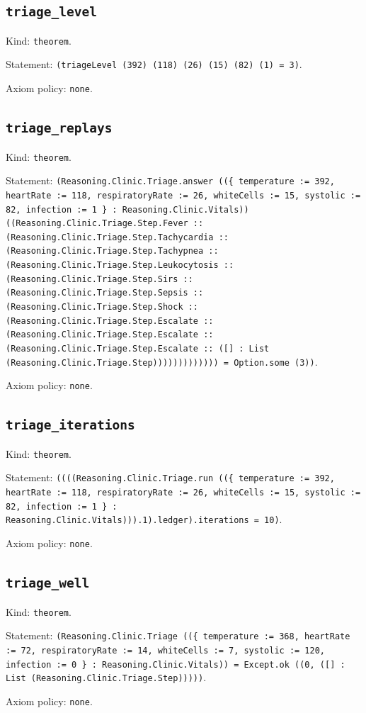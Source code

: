 \documentclass[11pt]{article}
\begin{document}
\subsection*{\texttt{triage\_level}}
\noindent Kind: \texttt{theorem}.\par
\noindent Statement: \texttt{(triageLevel (392) (118) (26) (15) (82) (1) = 3)}.\par
\noindent Axiom policy: \texttt{none}.\par
\subsection*{\texttt{triage\_replays}}
\noindent Kind: \texttt{theorem}.\par
\noindent Statement: \texttt{(Reasoning.Clinic.Triage.answer ((\{ temperature := 392, heartRate := 118, respiratoryRate := 26, whiteCells := 15, systolic := 82, infection := 1 \} : Reasoning.Clinic.Vitals)) ((Reasoning.Clinic.Triage.Step.Fever :: (Reasoning.Clinic.Triage.Step.Tachycardia :: (Reasoning.Clinic.Triage.Step.Tachypnea :: (Reasoning.Clinic.Triage.Step.Leukocytosis :: (Reasoning.Clinic.Triage.Step.Sirs :: (Reasoning.Clinic.Triage.Step.Sepsis :: (Reasoning.Clinic.Triage.Step.Shock :: (Reasoning.Clinic.Triage.Step.Escalate :: (Reasoning.Clinic.Triage.Step.Escalate :: (Reasoning.Clinic.Triage.Step.Escalate :: ([] : List (Reasoning.Clinic.Triage.Step))))))))))))) = Option.some (3))}.\par
\noindent Axiom policy: \texttt{none}.\par
\subsection*{\texttt{triage\_iterations}}
\noindent Kind: \texttt{theorem}.\par
\noindent Statement: \texttt{((((Reasoning.Clinic.Triage.run ((\{ temperature := 392, heartRate := 118, respiratoryRate := 26, whiteCells := 15, systolic := 82, infection := 1 \} : Reasoning.Clinic.Vitals))).1).ledger).iterations = 10)}.\par
\noindent Axiom policy: \texttt{none}.\par
\subsection*{\texttt{triage\_well}}
\noindent Kind: \texttt{theorem}.\par
\noindent Statement: \texttt{(Reasoning.Clinic.Triage ((\{ temperature := 368, heartRate := 72, respiratoryRate := 14, whiteCells := 7, systolic := 120, infection := 0 \} : Reasoning.Clinic.Vitals)) = Except.ok ((0, ([] : List (Reasoning.Clinic.Triage.Step)))))}.\par
\noindent Axiom policy: \texttt{none}.\par
\end{document}
